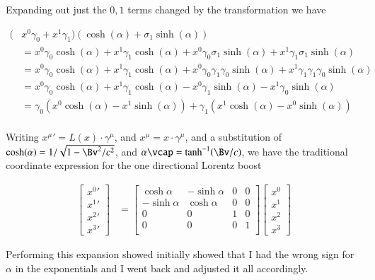 Expanding out just the $0,1$ terms changed by the transformation we have

\begin{align*}
(
&x^0 \gamma_0
+x^1 \gamma_1
)
(\cosh(\alpha) + \sigma_1 \sinh(\alpha)) \\
&=
x^0 \gamma_0 \cosh(\alpha) 
+x^1 \gamma_1 \cosh(\alpha) 
+x^0 \gamma_0 \sigma_1 \sinh(\alpha)
+x^1 \gamma_1 \sigma_1 \sinh(\alpha) \\
&=
x^0 \gamma_0 \cosh(\alpha) 
+x^1 \gamma_1 \cosh(\alpha) 
+x^0 \gamma_0 \gamma_1 \gamma_0 \sinh(\alpha)
+x^1 \gamma_1 \gamma_1 \gamma_0 \sinh(\alpha) \\
&=
x^0 \gamma_0 \cosh(\alpha) 
+x^1 \gamma_1 \cosh(\alpha) 
-x^0 \gamma_1 \sinh(\alpha)
-x^1 \gamma_0 \sinh(\alpha) \\
&=
\gamma_0 (x^0 \cosh(\alpha) -x^1 \sinh(\alpha) )
+\gamma_1 (x^1 \cosh(\alpha) -x^0 \sinh(\alpha) )
\\
\end{align*}

Writing ${x^\mu}' = L(x) \cdot \gamma^\mu$, and $x^\mu = x \cdot \gamma^\mu$,
and a substitution of $\cosh(\alpha) = 1/\sqrt{1 - \Bv^2/c^2}$, and $\alpha \vcap = \tanh^{-1}(\Bv/c)$,
we have the traditional coordinate
expression for the one directional Lorentz boost

\begin{align}
\begin{bmatrix}
{x^0}' \\
{x^1}' \\
{x^2}' \\
{x^3}'
\end{bmatrix}
&=
\begin{bmatrix}
\cosh\alpha & -\sinh\alpha & 0 & 0 \\
-\sinh\alpha & \cosh\alpha & 0 & 0 \\
0 & 0 & 1 & 0 \\
0 & 0 & 0 & 1 \\
\end{bmatrix}
\begin{bmatrix}
x^0 \\
x^1 \\
x^2 \\
x^3
\end{bmatrix}
\end{align}

Performing this expansion showed initially showed that I had the wrong sign for $\alpha$ in the exponentials and I went back and
adjusted it all accordingly.

